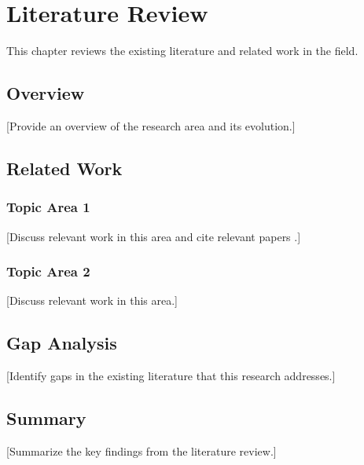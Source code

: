 \chapter{Literature Review}
\label{ch:literature-review}

This chapter reviews the existing literature and related work in the field.

\section{Overview}
\label{sec:lit-overview}

[Provide an overview of the research area and its evolution.]

\section{Related Work}
\label{sec:related-work}

\subsection{Topic Area 1}
\label{subsec:topic1}

[Discuss relevant work in this area and cite relevant papers \cite{example-reference}.]

\subsection{Topic Area 2}
\label{subsec:topic2}

[Discuss relevant work in this area.]

\section{Gap Analysis}
\label{sec:gap-analysis}

[Identify gaps in the existing literature that this research addresses.]

\section{Summary}
\label{sec:lit-summary}

[Summarize the key findings from the literature review.]

